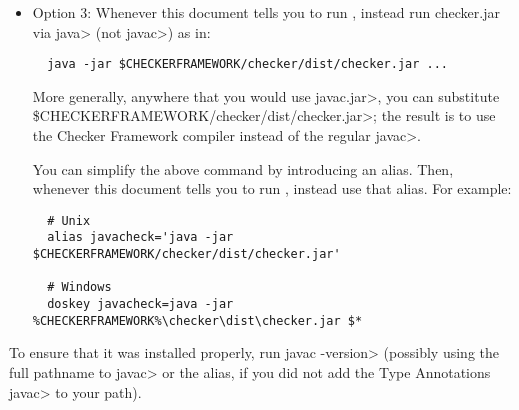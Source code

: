 \begin{enumerate}
\begin{itemize}
    You can simplify this by introducing an alias.  Then,
    whenever this document tells you to run , instead use that
    alias.  Here is the syntax for your 
    \verb|~/.bashrc| file:
\begin{Verbatim}
  alias javacheck='$CHECKERFRAMEWORK/checker/bin/javac'
\end{Verbatim}

   \item
   Option 3:
   Whenever this document tells you to run , instead
   run checker.jar via \<java> (not \<javac>) as in:

\begin{Verbatim}
  java -jar $CHECKERFRAMEWORK/checker/dist/checker.jar ...
\end{Verbatim}

   More generally, anywhere that you would use \<javac.jar>, you can substitute
   \<\$CHECKERFRAMEWORK/checker/dist/checker.jar>; the result is to use the Checker
   Framework compiler instead of the regular \<javac>.


    You can simplify the above command by introducing an alias.  Then,
    whenever this document tells you to run , instead use that
    alias.  For example:

\begin{Verbatim}
  # Unix
  alias javacheck='java -jar $CHECKERFRAMEWORK/checker/dist/checker.jar'

  # Windows
  doskey javacheck=java -jar %CHECKERFRAMEWORK%\checker\dist\checker.jar $*
\end{Verbatim}
\end{itemize}

\end{enumerate}


To ensure that it was installed properly, run \<javac -version> (possibly using the
full pathname to \<javac> or the alias, if you did not add the Type Annotations \<javac> to your path).

